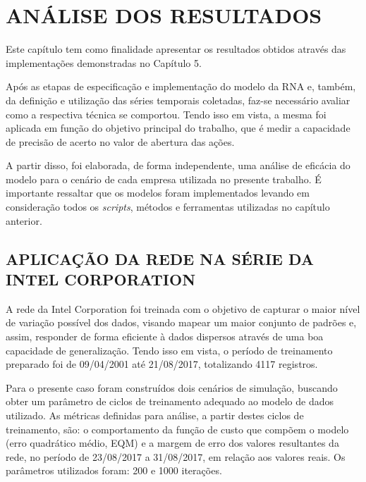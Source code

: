 
\chapter{ANÁLISE DOS RESULTADOS}\label{ch:resultados}
Este capítulo tem como finalidade apresentar os resultados obtidos através das implementações demonstradas no Capítulo 5.

Após as etapas de especificação e implementação do modelo da RNA e, também, da definição e utilização das séries temporais coletadas, faz-se necessário avaliar como a respectiva técnica se comportou. Tendo isso em vista, a mesma foi aplicada em função do objetivo principal do trabalho, que é medir a capacidade de precisão de acerto no valor de abertura das ações.

A partir disso, foi elaborada, de forma independente, uma análise de eficácia do modelo para o cenário de cada empresa utilizada no presente trabalho. É importante ressaltar que os modelos foram implementados levando em consideração todos os \textit{scripts}, métodos e ferramentas utilizadas no capítulo anterior.

\section{APLICAÇÃO DA REDE NA SÉRIE DA INTEL CORPORATION}
A rede da Intel Corporation foi treinada com o objetivo de capturar o maior nível de variação possível dos dados, visando mapear um maior conjunto de padrões e, assim, responder de forma eficiente à dados dispersos através de uma boa capacidade de generalização. Tendo isso em vista, o período de treinamento preparado foi de 09/04/2001 até 21/08/2017, totalizando 4117 registros.

Para o presente caso foram construídos dois cenários de simulação, buscando obter um parâmetro de ciclos de treinamento adequado ao modelo de dados utilizado. As métricas definidas para análise, a partir destes ciclos de treinamento, são: o comportamento da função de custo que compõem o modelo (erro quadrático médio, EQM) e a margem de erro dos valores resultantes da rede, no período de 23/08/2017 a 31/08/2017, em relação aos valores reais. Os parâmetros utilizados foram: 200 e 1000 iterações.

